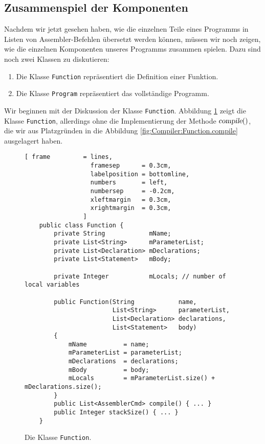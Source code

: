 \subsection{Zusammenspiel der Komponenten}
Nachdem wir jetzt gesehen haben, wie die einzelnen Teile eines Programms in Listen von
Assembler-Befehlen \"ubersetzt werden k\"onnen, m\"ussen wir noch zeigen, wie die einzelnen Komponenten
unseres Programms zusammen spielen.  Dazu sind noch zwei Klassen zu diskutieren:
\begin{enumerate}
\item Die Klasse \texttt{Function} repr\"asentiert die Definition einer Funktion.
\item Die Klasse \texttt{Program}  repr\"asentiert das vollst\"andige Programm.
\end{enumerate}
Wir beginnen mit der Diskussion der Klasse \texttt{Function}.  Abbildung
\ref{fig:Compiler:Function.java} zeigt die Klasse \texttt{Function}, allerdings ohne die
Implementierung der Methode $\textsl{compile}()$, die wir aus Platzgr\"unden in die Abbildung
\ref{fig:Compiler:Function.compile} ausgelagert haben.

\begin{figure}[!ht]
\centering
\begin{Verbatim}[ frame         = lines, 
                  framesep      = 0.3cm, 
                  labelposition = bottomline,
                  numbers       = left,
                  numbersep     = -0.2cm,
                  xleftmargin   = 0.3cm,
                  xrightmargin  = 0.3cm,
                ]
    public class Function {
        private String            mName;
        private List<String>      mParameterList;
        private List<Declaration> mDeclarations;
        private List<Statement>   mBody;
        
        private Integer           mLocals; // number of local variables
    
        public Function(String            name, 
                        List<String>      parameterList, 
                        List<Declaration> declarations, 
                        List<Statement>   body) 
        {
            mName          = name;
            mParameterList = parameterList;
            mDeclarations  = declarations;
            mBody          = body;
            mLocals        = mParameterList.size() + mDeclarations.size();
        }
        public List<AssemblerCmd> compile() { ... }
        public Integer stackSize() { ... }
    }
\end{Verbatim}
\vspace*{-0.3cm}
\caption{Die Klasse \texttt{Function}.}
\label{fig:Compiler:Function.java}
\end{figure}


